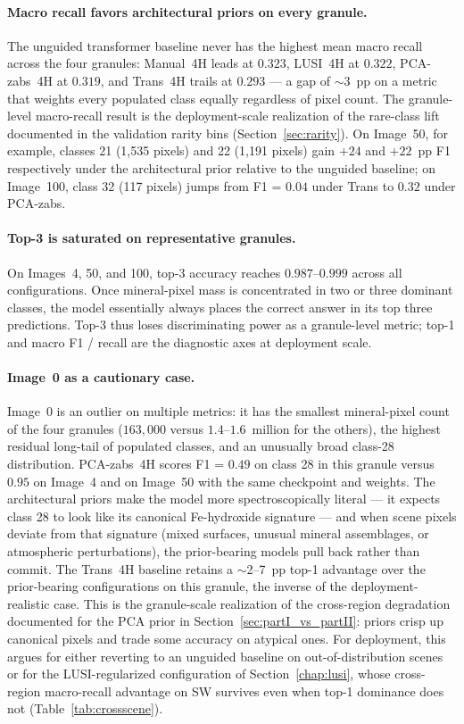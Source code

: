 \documentclass[11pt]{report}
\begin{document}
\paragraph{Macro recall favors architectural priors on every granule.}
The unguided transformer baseline never has the highest mean macro recall across the four granules: Manual~4H leads at $0.323$, LUSI~4H at $0.322$, PCA-zabs~4H at $0.319$, and Trans~4H trails at $0.293$ --- a gap of $\sim$3~pp on a metric that weights every populated class equally regardless of pixel count. The granule-level macro-recall result is the deployment-scale realization of the rare-class lift documented in the validation rarity bins (Section~\ref{sec:rarity}). On Image~50, for example, classes 21 (1{,}535 pixels) and 22 (1{,}191 pixels) gain $+24$ and $+22$~pp F1 respectively under the architectural prior relative to the unguided baseline; on Image~100, class 32 (117 pixels) jumps from F1 = $0.04$ under Trans to $0.32$ under PCA-zabs.

\paragraph{Top-3 is saturated on representative granules.}
On Images~4, 50, and 100, top-3 accuracy reaches $0.987$--$0.999$ across all configurations. Once mineral-pixel mass is concentrated in two or three dominant classes, the model essentially always places the correct answer in its top three predictions. Top-3 thus loses discriminating power as a granule-level metric; top-1 and macro F1 / recall are the diagnostic axes at deployment scale.

\paragraph{Image~0 as a cautionary case.}
Image~0 is an outlier on multiple metrics: it has the smallest mineral-pixel count of the four granules ($163{,}000$ versus $1.4$--$1.6$~million for the others), the highest residual long-tail of populated classes, and an unusually broad class-28 distribution. PCA-zabs~4H scores F1 = $0.49$ on class 28 in this granule versus $0.95$ on Image~4 and on Image~50 with the same checkpoint and weights. The architectural priors make the model more spectroscopically literal --- it expects class 28 to look like its canonical Fe-hydroxide signature --- and when scene pixels deviate from that signature (mixed surfaces, unusual mineral assemblages, or atmospheric perturbations), the prior-bearing models pull back rather than commit. The Trans~4H baseline retains a $\sim$2--7~pp top-1 advantage over the prior-bearing configurations on this granule, the inverse of the deployment-realistic case. This is the granule-scale realization of the cross-region degradation documented for the PCA prior in Section~\ref{sec:partI_vs_partII}: priors crisp up canonical pixels and trade some accuracy on atypical ones. For deployment, this argues for either reverting to an unguided baseline on out-of-distribution scenes or for the LUSI-regularized configuration of Section~\ref{chap:lusi}, whose cross-region macro-recall advantage on SW survives even when top-1 dominance does not (Table~\ref{tab:crossscene}).
\end{document}
